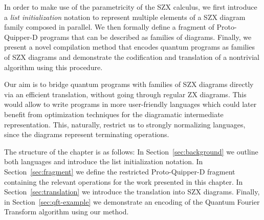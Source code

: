 In order to make use of the parametricity of the SZX calculus, we first introduce a \textit{list initialization} notation to represent multiple elements of a SZX diagram family composed in parallel. We then formally define a fragment of Proto-Quipper-D programs that can be described as families of diagrams. Finally, we present a novel compilation method that encodes quantum programs as families of SZX diagrams and demonstrate the codification and translation of a nontrivial algorithm using this procedure.

Our aim is to bridge quantum programs with families of SZX diagrams directly via an efficient translation, without going through regular ZX diagrams. This would allow to write programs in more user-friendly languages which could later benefit from optimization techniques for the diagramatic intermediate representation. This, naturally, restrict us to strongly normalizing languages, since the diagrams represent terminating operations.

The structure of the chapter is as follows: In Section~\ref{sec:background} we outline both languages and introduce the list initialization notation. In Section~\ref{sec:fragment} we define the restricted Proto-Quipper-D fragment containing the relevant operations for the work presented in this chapter. In Section~\ref{sec:translation} we introduce the translation into SZX diagrams. Finally, in Section~\ref{sec:qft-example} we demonstrate an encoding of the Quantum Fourier Transform algorithm using our method.
